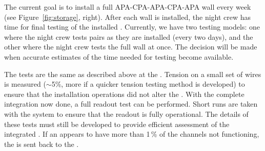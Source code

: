 The current goal is to install a full APA-CPA-APA-CPA-APA wall every week (see Figure~\ref{fig:storage}, right). After each wall is installed, the night crew has time for final testing of the installed . Currently, we have two testing models: one where the night crew tests  pairs as they are installed (every two days), and the other where the night crew tests the full wall at once. The decision will be made when accurate estimates of the time needed for testing become available.


The tests are %
the same as described above at the . Tension on a small set of wires is measured ($\sim$5\%, more if a quicker tension testing method is developed) to ensure that the installation operations did not alter the . With the complete integration now done, a full readout test can be performed. Short runs are taken with the  system to ensure that the readout is fully operational. The details of these tests must still be developed to provide efficient assessment of the integrated . If an  appears to have more than \num{1}\,\% of the channels not functioning, the  is sent back to the .




